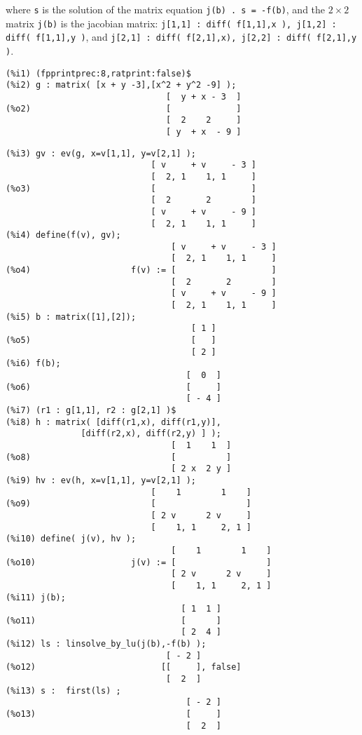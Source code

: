 \documentclass[12pt]{article}
\begin{document}
  where \verb|s| is the solution of the matrix equation \verb|j(b) . s = -f(b)|, and
  the $2 \times 2$ matrix \verb|j(b)| is the jacobian matrix:
  \verb|j[1,1] : diff( f[1,1],x ), j[1,2] : diff( f[1,1],y )|,
   and \verb|j[2,1] : diff( f[2,1],x), j[2,2] : diff( f[2,1],y )|.  
\small
\begin{verbatim}
(%i1) (fpprintprec:8,ratprint:false)$
(%i2) g : matrix( [x + y -3],[x^2 + y^2 -9] );
                                [  y + x - 3  ]
(%o2)                           [             ]
                                [  2    2     ]
                                [ y  + x  - 9 ]
\end{verbatim}
\newpage
\begin{verbatim}
(%i3) gv : ev(g, x=v[1,1], y=v[2,1] );
                             [ v     + v     - 3 ]
                             [  2, 1    1, 1     ]
(%o3)                        [                   ]
                             [  2       2        ]
                             [ v     + v     - 9 ]
                             [  2, 1    1, 1     ]
(%i4) define(f(v), gv);
                                 [ v     + v     - 3 ]
                                 [  2, 1    1, 1     ]
(%o4)                    f(v) := [                   ]
                                 [  2       2        ]
                                 [ v     + v     - 9 ]
                                 [  2, 1    1, 1     ]
(%i5) b : matrix([1],[2]);
                                     [ 1 ]
(%o5)                                [   ]
                                     [ 2 ]
(%i6) f(b);
                                    [  0  ]
(%o6)                               [     ]
                                    [ - 4 ]
(%i7) (r1 : g[1,1], r2 : g[2,1] )$
(%i8) h : matrix( [diff(r1,x), diff(r1,y)],
               [diff(r2,x), diff(r2,y) ] );
                                 [  1    1  ]
(%o8)                            [          ]
                                 [ 2 x  2 y ]
(%i9) hv : ev(h, x=v[1,1], y=v[2,1] );
                             [    1        1    ]
(%o9)                        [                  ]
                             [ 2 v      2 v     ]
                             [    1, 1     2, 1 ]
(%i10) define( j(v), hv );
                                 [    1        1    ]
(%o10)                   j(v) := [                  ]
                                 [ 2 v      2 v     ]
                                 [    1, 1     2, 1 ]
(%i11) j(b);
                                   [ 1  1 ]
(%o11)                             [      ]
                                   [ 2  4 ]
(%i12) ls : linsolve_by_lu(j(b),-f(b) );
                                [ - 2 ]
(%o12)                         [[     ], false]
                                [  2  ]
(%i13) s :  first(ls) ;
                                    [ - 2 ]
(%o13)                              [     ]
                                    [  2  ]
\end{verbatim}
\end{document}
